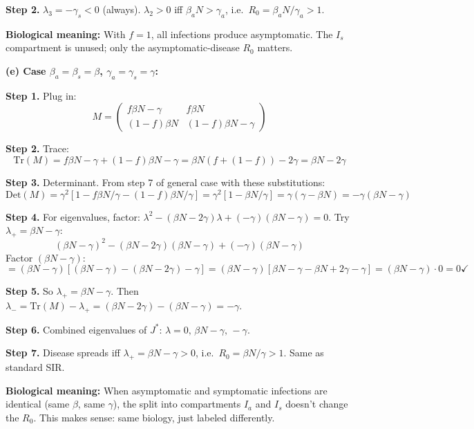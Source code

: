 \documentclass[10pt]{article}
\begin{document}
\begin{solution}
\textbf{Step 2.} $\lambda_3 = -\gamma_s < 0$ (always). $\lambda_2 > 0$ iff $\beta_a N > \gamma_a$, i.e.\ $R_0 = \beta_a N/\gamma_a > 1$.

\textbf{Biological meaning:} With $f = 1$, all infections produce asymptomatic. The $I_s$ compartment is unused; only the asymptomatic-disease $R_0$ matters.

\medskip\textbf{(e) Case $\beta_a = \beta_s = \beta$, $\gamma_a = \gamma_s = \gamma$:}

\textbf{Step 1.} Plug in:
\[
M = \begin{pmatrix} f\beta N - \gamma & f\beta N \\ (1-f)\beta N & (1-f)\beta N - \gamma \end{pmatrix}
\]

\textbf{Step 2.} Trace:
\[
\text{Tr}(M) = f\beta N - \gamma + (1-f)\beta N - \gamma = \beta N(f + (1-f)) - 2\gamma = \beta N - 2\gamma
\]

\textbf{Step 3.} Determinant. From step 7 of general case with these substitutions:
\[
\text{Det}(M) = \gamma^2[1 - f\beta N/\gamma - (1-f)\beta N/\gamma] = \gamma^2[1 - \beta N/\gamma] = \gamma(\gamma - \beta N) = -\gamma(\beta N - \gamma)
\]

\textbf{Step 4.} For eigenvalues, factor: $\lambda^2 - (\beta N - 2\gamma)\lambda + (-\gamma)(\beta N - \gamma) = 0$. Try $\lambda_+ = \beta N - \gamma$:
\[
(\beta N - \gamma)^2 - (\beta N - 2\gamma)(\beta N - \gamma) + (-\gamma)(\beta N - \gamma)
\]
Factor $(\beta N - \gamma)$:
\[
= (\beta N - \gamma)[(\beta N - \gamma) - (\beta N - 2\gamma) - \gamma] = (\beta N - \gamma)[\beta N - \gamma - \beta N + 2\gamma - \gamma] = (\beta N - \gamma)\cdot 0 = 0 \checkmark
\]

\textbf{Step 5.} So $\lambda_+ = \beta N - \gamma$. Then $\lambda_- = \text{Tr}(M) - \lambda_+ = (\beta N - 2\gamma) - (\beta N - \gamma) = -\gamma$.

\textbf{Step 6.} Combined eigenvalues of $J^*$: $\lambda = 0,\, \beta N - \gamma,\, -\gamma$.

\textbf{Step 7.} Disease spreads iff $\lambda_+ = \beta N - \gamma > 0$, i.e.\ $R_0 = \beta N/\gamma > 1$. Same as standard SIR.

\textbf{Biological meaning:} When asymptomatic and symptomatic infections are identical (same $\beta$, same $\gamma$), the split into compartments $I_a$ and $I_s$ doesn't change the $R_0$. This makes sense: same biology, just labeled differently.
\end{solution}
\end{document}
